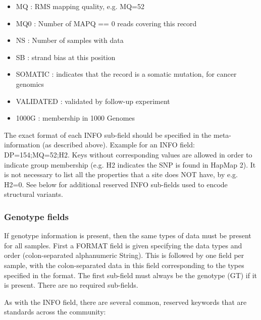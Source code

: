 \documentclass[8pt]{article}
\begin{document}
\begin{enumerate}
\begin{itemize}
  \item MQ : RMS mapping quality, e.g. MQ=52
  \item MQ0 : Number of MAPQ == 0 reads covering this record
  \item NS : Number of samples with data
  \item SB : strand bias at this position
  \item SOMATIC : indicates that the record is a somatic mutation, for cancer genomics
  \item VALIDATED : validated by follow-up experiment
  \item 1000G : membership in 1000 Genomes
\end{itemize}
\end{enumerate}
The exact format of each INFO sub-field should be specified in the meta-information (as described above).
Example for an INFO field: DP=154;MQ=52;H2. Keys without corresponding values are allowed in order to indicate group membership (e.g. H2 indicates the SNP is found in HapMap 2). It is not necessary to list all the properties that a site does NOT have, by e.g. H2=0. See below for additional reserved INFO sub-fields used to encode structural variants.
\subsubsection{Genotype fields}
If genotype information is present, then the same types of data must be present for all samples. First a FORMAT field is given specifying the data types and order (colon-separated alphanumeric String). This is followed by one field per sample, with the colon-separated data in this field corresponding to the types specified in the format. The first sub-field must always be the genotype (GT) if it is present.  There are no required sub-fields.

As with the INFO field, there are several common, reserved keywords that are standards across the community:
\end{document}
